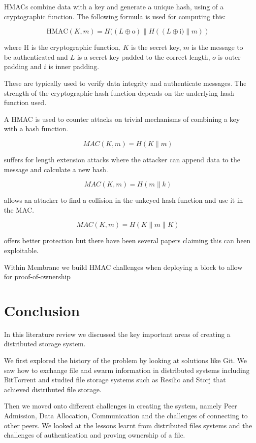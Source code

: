 \documentclass[11pt, a4paper, twocolumn, twoside]{report}
\begin{document}
HMACs combine data with a key and generate a unique hash, using of a cryptographic function. \citep{krawczyk1997hmac} The following formula is used for computing this:

$$\mbox{HMAC}(K, m) = H((L \oplus \mbox{o}) \parallel H((L \oplus \mbox{i)} \parallel m))$$

where H is the cryptographic function, $K$ is the secret key, $m$ is the message to be authenticated and $L$ is a secret key padded to the correct length, $o$ is outer padding and $i$ is inner padding.

These are typically used to verify data integrity and authenticate messages. The strength of the cryptographic hash function depends on the underlying hash function used.

A HMAC is used to counter attacks on trivial mechanisms of combining a key with a hash function.

$$MAC(K, m) = H(K \parallel m)$$

suffers for length extension attacks where the attacker can append data to the message and calculate a new hash. 

$$MAC(K, m) = H(m \parallel k)$$

allows an attacker to find a collision in the unkeyed hash function and use it in the MAC. 

$$MAC(K, m) = H(K \parallel m \parallel K)$$ 

offers better protection but there have been several papers claiming this can been exploitable. \citep{bellare1996keying}

Within Membrane we build HMAC challenges when deploying a block to allow for proof-of-ownership

\section{Conclusion}
In this literature review we discussed the key important areas of creating a distributed storage system.

We first explored the history of the problem by looking at solutions like Git. We saw how to exchange file and swarm information in distributed systems including BitTorrent and studied file storage systems such as Resilio and Storj that achieved distributed file storage.

Then we moved onto different challenges in creating the system, namely Peer Admission, Data Allocation, Communication and the challenges of connecting to other peers. We looked at the lessons learnt from distributed files systems and the challenges of authentication and proving ownership of a file.
\end{document}

